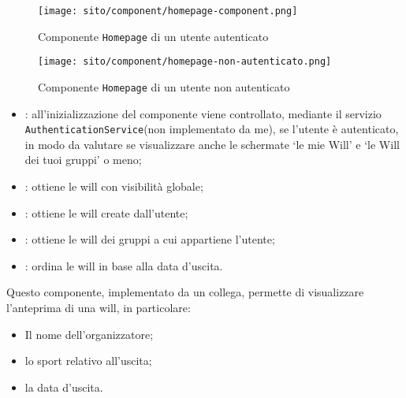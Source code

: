 \begin{figure}[H]

    \centerline{\texttt{[image: sito/component/homepage-component.png]}}
    \caption{Componente \texttt{Homepage} di un utente autenticato}
\end{figure}

\begin{figure}[H]

    \centerline{\texttt{[image: sito/component/homepage-non-autenticato.png]}}
    \caption{Componente \texttt{Homepage} di un utente non autenticato}
\end{figure}


\begin{itemize}
    \item {}: all'inizializzazione del componente viene
          controllato, mediante il servizio \texttt{AuthenticationService}(non
          implementato da me), se l'utente è autenticato, in modo da valutare
          se
          visualizzare anche le schermate \enquote*{le mie Will} e \enquote*{le
              Will dei
              tuoi gruppi} o meno;
    \item {}: ottiene le \gls{will} con
          visibilità globale;
    \item {}: ottiene le \gls{will} create dall'utente;
    \item {}: ottiene le \gls{will} dei gruppi a cui
          appartiene l'utente;
    \item {}: ordina le \gls{will} in base alla data d'uscita.
\end{itemize}

\label{par:WillCard}
Questo componente, implementato da un collega, permette di visualizzare
l'anteprima di una \gls{will}, in particolare:
\begin{itemize}
    \item Il nome dell'organizzatore;
    \item lo sport relativo all'uscita;
    \item la data d'uscita.
\end{itemize}

